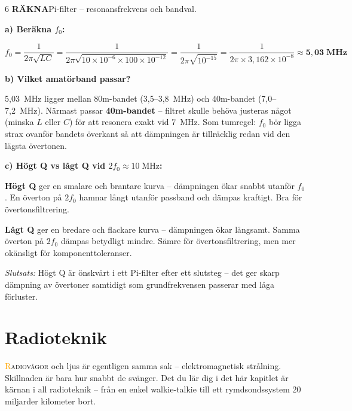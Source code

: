 \documentclass[a4paper,11pt,twoside]{book}
\newcommand{\qrakna}{\colorbox{bluepale}{\textcolor{bluedark}{\headingfont\bfseries\tiny RÄKNA}}}
\begin{document}
\begin{facitblock}{6}
\qrakna\quad Pi-filter -- resonansfrekvens och bandval.
\tcblower

\textbf{a) Beräkna $f_0$:}

\[
f_0 = \frac{1}{2\pi\sqrt{LC}}
    = \frac{1}{2\pi\sqrt{10\times10^{-6} \times 100\times10^{-12}}}
    = \frac{1}{2\pi\sqrt{10^{-15}}}
    = \frac{1}{2\pi \times 3{,}162\times10^{-8}}
    \approx \mathbf{5{,}03\;\text{MHz}}
\]

\textbf{b) Vilket amatörband passar?}

5,03~MHz ligger mellan 80m-bandet (3,5--3,8~MHz) och 40m-bandet
(7,0--7,2~MHz). Närmast passar \textbf{40m-bandet} -- filtret
skulle behöva justeras något (minska $L$ eller $C$) för att
resonera exakt vid 7~MHz. Som tumregel: $f_0$ bör ligga strax
ovanför bandets överkant så att dämpningen är tillräcklig redan
vid den lägsta övertonen.

\textbf{c) Högt Q vs lågt Q vid $2f_0 \approx 10\;\text{MHz}$:}

\textbf{Högt Q} ger en smalare och brantare kurva -- dämpningen
ökar snabbt utanför $f_0$. En överton på $2f_0$ hamnar långt
utanför passband och dämpas kraftigt. Bra för övertonsfiltrering.

\textbf{Lågt Q} ger en bredare och flackare kurva -- dämpningen
ökar långsamt. Samma överton på $2f_0$ dämpas betydligt mindre.
Sämre för övertonsfiltrering, men mer okänsligt för
komponenttoleranser.

\medskip
\textit{Slutsats:} Högt Q är önskvärt i ett Pi-filter efter ett
slutsteg -- det ger skarp dämpning av övertoner samtidigt som
grundfrekvensen passerar med låga förluster.
\end{facitblock}




\chapter{Radioteknik}

\lettrine[lines=2]{\textcolor{orange}{R}}{adiovågor} och ljus är egentligen samma sak -- elektromagnetisk strålning. Skillnaden är bara hur snabbt de svänger. Det du lär dig i det här kapitlet är kärnan i all radioteknik -- från en enkel walkie-talkie till ett rymdsondssystem 20 miljarder kilometer bort.
\end{document}
